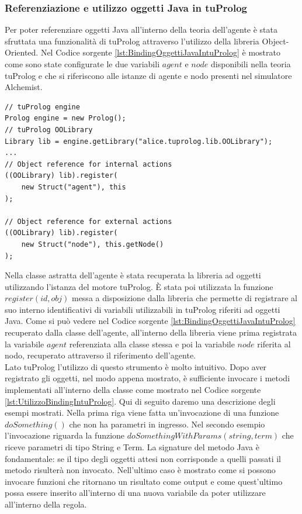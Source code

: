 \subsubsection{Referenziazione e utilizzo oggetti Java in tuProlog}
Per poter referenziare oggetti Java all'interno della teoria dell'agente è stata sfruttata una funzionalità di tuProlog attraverso l'utilizzo della libreria Object-Oriented.
Nel Codice sorgente \ref{lst:BindingOggettiJavaIntuProlog} è mostrato come sono state configurate le due variabili $agent$ e $node$ disponibili nella teoria tuProlog e che si riferiscono alle istanze di agente e nodo presenti nel simulatore Alchemist.
\begin{lstlisting}[firstnumber=1,label={lst:BindingOggettiJavaIntuProlog},caption={Binding oggetti Java in tuProlog}]
// tuProlog engine
Prolog engine = new Prolog();
// tuProlog OOLibrary
Library lib = engine.getLibrary("alice.tuprolog.lib.OOLibrary");
...
// Object reference for internal actions
((OOLibrary) lib).register(
	new Struct("agent"), this
);

// Object reference for external actions
((OOLibrary) lib).register(
	new Struct("node"), this.getNode()
);
\end{lstlisting}
Nella classe astratta dell'agente è stata recuperata la libreria ad oggetti utilizzando l'istanza del motore tuProlog.
\`E stata poi utilizzata la funzione $register(id, obj)$ messa a disposizione dalla libreria che permette di registrare al suo interno identificativi di variabili utilizzabili in tuProlog riferiti ad oggetti Java.
Come si può vedere nel Codice sorgente \ref{lst:BindingOggettiJavaIntuProlog} recuperato dalla classe dell'agente, all'interno della libreria viene prima registrata la variabile $agent$ referenziata alla classe stessa e poi la variabile $node$ riferita al nodo, recuperato attraverso il riferimento dell'agente.
\\
Lato tuProlog l'utilizzo di questo strumento è molto intuitivo. Dopo aver registrato gli oggetti, nel modo appena mostrato, è sufficiente invocare i metodi implementati all'interno della classe come mostrato nel Codice sorgente \ref{lst:UtilizzoBindingIntuProlog}. Qui di seguito daremo una descrizione degli esempi mostrati.
Nella prima riga viene fatta un'invocazione di una funzione $doSomething()$ che non ha parametri in ingresso.
Nel secondo esempio l'invocazione riguarda la funzione $doSomethingWithParams(string, term)$ che riceve parametri di tipo String e Term. La signature del metodo Java è fondamentale: se il tipo degli oggetti attesi non corrisponde a quelli passati il metodo risulterà non invocato.
Nell'ultimo caso è mostrato come si possono invocare funzioni che ritornano un risultato come output e come quest'ultimo possa essere inserito all'interno di una nuova variabile da poter utilizzare all'interno della regola.

